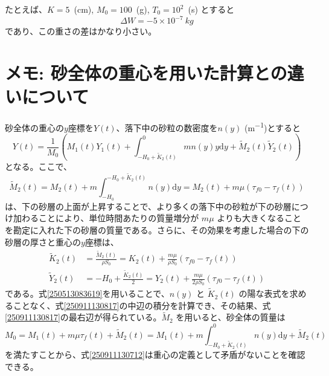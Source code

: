 \documentclass[]{article}
\begin{document}
たとえば、$K=5$~(\si{cm}), $M_0=100$~(\si{g}), $T_0=10^2$~(\si{s}) とすると
\begin{equation} \label{250517205142} 
   \Delta W = -5\times 10^{-7}~\si{kg}
\end{equation}
であり、この重さの差はかなり小さい。


\section{メモ: 砂全体の重心を用いた計算との違いについて}
砂全体の重心の$y$座標を$Y(t)$、落下中の砂粒の数密度を$n(y)$ (\si{m^{-1}})とすると
\begin{equation} \label{250911130712}
   Y(t) = \frac{1}{M_0}\left(M_1(t) Y_1(t) + \int_{-H_0+\tilde{K}_2(t)}^0m n(y) y\mathrm{d}y + \tilde{M}_2(t) \tilde{Y}_2(t)\right)
\end{equation}
となる。ここで、
\begin{equation} \label{250911130817}
  \tilde{M}_2(t) = M_2(t) + m\int_{-H_0}^{-H_0+\tilde{K}_2(t)}n(y)\mathrm{d}y = M_2(t) + m\mu(\tau_{f0}-\tau_f(t))
\end{equation}
は、下の砂層の上面が上昇することで、より多くの落下中の砂粒が下の砂層につけ加わることにより、単位時間あたりの質量増分が $m\mu$ よりも大きくなることを勘定に入れた下の砂層の質量である。さらに、その効果を考慮した場合の下の砂層の厚さと重心の$y$座標は、
\begin{align}
   \tilde{K}_2(t) &= \frac{\tilde{M}_2(t)}{\rho S_0} = K_2(t) + \frac{m\mu}{\rho S_0}(\tau_{f0}-\tau_f(t))  \label{250911174154a}\\
   \tilde{Y}_2(t) &= -H_0 + \frac{\tilde{K}_2(t)}{2}= Y_2(t) + \frac{m\mu}{2\rho S_0}(\tau_{f0}-\tau_f(t))  \label{250911174154b}
\end{align}
である。式\eqref{250513083619}を用いることで、$n(y)$ と $\tilde{K}_2(t)$ の陽な表式を求めることなく、式\eqref{250911130817}の中辺の積分を計算でき、その結果、式\eqref{250911130817}の最右辺が得られている。$\tilde{M}_2$ を用いると、砂全体の質量は
\begin{equation} \label{250911135650}
   M_0 = M_1(t) + m\mu \tau_{f}(t) + \tilde{M}_2(t) = M_1(t) + m\int_{-H_0+\tilde{K}_2(t)}^0n(y) \mathrm{d}y + \tilde{M}_2(t)
\end{equation}
を満たすことから、式\eqref{250911130712}は重心の定義として矛盾がないことを確認できる。
\end{document}
